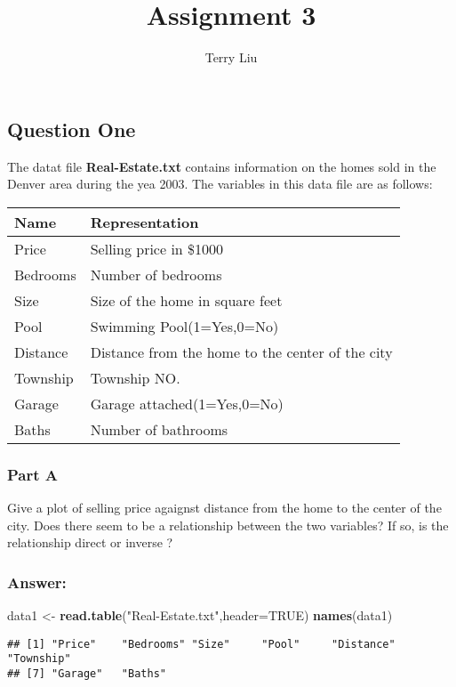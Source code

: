 \documentclass[]{article}
\title{Assignment 3}
\author{Terry Liu}
\date{}
\newenvironment{Shaded}{\begin{snugshade}}{\end{snugshade}}
\newcommand{\KeywordTok}[1]{\textcolor[rgb]{0.13,0.29,0.53}{\textbf{#1}}}
\newcommand{\DataTypeTok}[1]{\textcolor[rgb]{0.13,0.29,0.53}{#1}}
\newcommand{\StringTok}[1]{\textcolor[rgb]{0.31,0.60,0.02}{#1}}
\newcommand{\OtherTok}[1]{\textcolor[rgb]{0.56,0.35,0.01}{#1}}
\newcommand{\NormalTok}[1]{#1}
\begin{document}
\maketitle

\subsection{Question One}\label{question-one}

The datat file \textbf{Real-Estate.txt} contains information on the
homes sold in the Denver area during the yea 2003. The variables in this
data file are as follows:

\begin{longtable}[]{@{}ll@{}}
\toprule
Name & Representation\tabularnewline
\midrule
\endhead
Price & Selling price in \$1000\tabularnewline
Bedrooms & Number of bedrooms\tabularnewline
Size & Size of the home in square feet\tabularnewline
Pool & Swimming Pool(1=Yes,0=No)\tabularnewline
Distance & Distance from the home to the center of the
city\tabularnewline
Township & Township NO.\tabularnewline
Garage & Garage attached(1=Yes,0=No)\tabularnewline
Baths & Number of bathrooms\tabularnewline
\bottomrule
\end{longtable}

\subsubsection{Part A}\label{part-a}

Give a plot of selling price agaignst distance from the home to the
center of the city. Does there seem to be a relationship between the two
variables? If so, is the relationship direct or inverse ?

\subsubsection{Answer:}\label{answer}

\begin{Shaded}
\begin{Highlighting}[]
\NormalTok{data1 <-}\StringTok{ }\KeywordTok{read.table}\NormalTok{(}\StringTok{"Real-Estate.txt"}\NormalTok{,}\DataTypeTok{header=}\OtherTok{TRUE}\NormalTok{)}
\KeywordTok{names}\NormalTok{(data1)}
\end{Highlighting}
\end{Shaded}

\begin{verbatim}
## [1] "Price"    "Bedrooms" "Size"     "Pool"     "Distance" "Township"
## [7] "Garage"   "Baths"
\end{verbatim}
\end{document}
